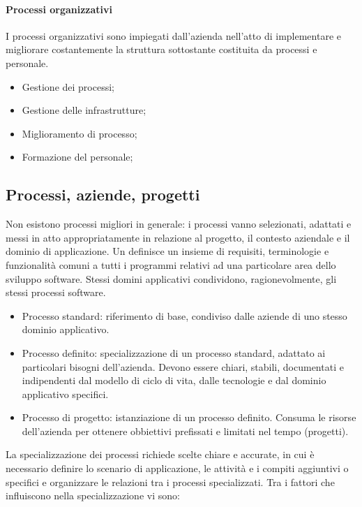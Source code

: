 \paragraph{Processi organizzativi}

I processi organizzativi sono impiegati dall'azienda nell'atto di implementare e
migliorare costantemente la struttura sottostante costituita da processi e
personale.

\begin{itemize}
  \item Gestione dei processi;
  \item Gestione delle infrastrutture;
  \item Miglioramento di processo;
  \item Formazione del personale;
\end{itemize}

\subsection{Processi, aziende, progetti}

Non esistono processi migliori in generale: i processi vanno selezionati,
adattati e messi in atto appropriatamente in relazione al progetto, il contesto
aziendale e il dominio di applicazione. Un 
definisce un insieme di requisiti, terminologie e funzionalità comuni a tutti i
programmi relativi ad una particolare area dello sviluppo software. Stessi
domini applicativi condividono, ragionevolmente, gli stessi processi software.

\begin{itemize}
  \item Processo standard: riferimento di base, condiviso dalle aziende di uno
    stesso dominio applicativo.
  \item Processo definito: specializzazione di un processo standard, adattato ai
    particolari bisogni dell'azienda. Devono essere chiari, stabili, documentati
    e indipendenti dal modello di ciclo di vita, dalle tecnologie e dal dominio
    applicativo specifici.
  \item Processo di progetto: istanziazione di un processo definito. Consuma le
    risorse dell'azienda per ottenere obbiettivi prefissati e limitati nel tempo
    (progetti).
\end{itemize}

La specializzazione dei processi richiede scelte chiare e accurate, in cui è
necessario definire lo scenario di applicazione, le attività e i compiti
aggiuntivi o specifici e organizzare le relazioni tra i processi specializzati.
Tra i fattori che influiscono nella specializzazione vi sono:

